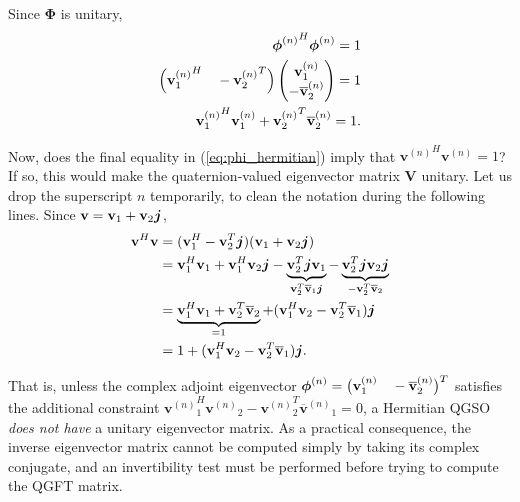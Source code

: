 Since $\mathbf{\Phi}$ is unitary,
\begin{equation}
\label{eq:phi_hermitian}
\begin{aligned}
{\mathbf{\boldsymbol{\phi}}^{(n)}}^H \mathbf{\boldsymbol{\phi}}^{(n)} = 1 \\
\Big({\mathbf{v}^{(n)}_1}^H \quad - {\mathbf{v}^{(n)}_2}^T \Big)
\begin{pmatrix}
\mathbf{v}^{(n)}_1 \\ 
- \overline{\mathbf{v}}^{(n)}_2
\end{pmatrix} = 1 \\
{\mathbf{v}^{(n)}_1}^H \mathbf{v}^{(n)}_1 + {\mathbf{v}^{(n)}_2}^T \overline{\mathbf{v}}^{(n)}_2 = 1.
\end{aligned}
\end{equation}

Now, does the final equality in (\ref{eq:phi_hermitian}) imply that ${\mathbf{v}^{(n)}}^H \mathbf{v}^{(n)} = 1$? If so, this would make the quaternion-valued eigenvector matrix $\mathbf{V}$ unitary. Let us drop the superscript $n$ temporarily, to clean the notation during the following lines. Since $\mathbf{v} = \mathbf{v}_1 + \mathbf{v}_2 \boldsymbol{j}$,
\begin{equation}
\begin{aligned}
\mathbf{v}^H \mathbf{v} &= (\mathbf{v}^H_1 - \mathbf{v}^T_2 \boldsymbol{j}) (\mathbf{v}_1 + \mathbf{v}_2 \boldsymbol{j}) \\
&= \mathbf{v}^H_1 \mathbf{v}_1 + \mathbf{v}^H_1 \mathbf{v}_2 \boldsymbol{j}
- \underbrace{\mathbf{v}^T_2 \boldsymbol{j} \mathbf{v}_1}_{\mathbf{v}^T_2 \overline{\mathbf{v}}_1 \boldsymbol{j}} - \underbrace{\mathbf{v}_2^T \boldsymbol{j} \mathbf{v}_2 \boldsymbol{j}}_{- \mathbf{v}_2^T \overline{\mathbf{v}}_2} \\
&= \underbrace{\mathbf{v}_1^H \mathbf{v}_1 + \mathbf{v}_2^T \overline{\mathbf{v}}_2}_{= 1} +
(\mathbf{v}^H_1 \mathbf{v}_2 - \mathbf{v}_2^T \overline{\mathbf{v}}_1) \boldsymbol{j} \\
&= 1 + (\mathbf{v}^H_1 \mathbf{v}_2 - \mathbf{v}_2^T \overline{\mathbf{v}}_1) \boldsymbol{j}.
\end{aligned}
\end{equation}

That is, unless the complex adjoint eigenvector $\mathbf{\boldsymbol{\phi}}^{(n)} = \big( \mathbf{v}^{(n)}_1 \quad - \overline{\mathbf{v}}^{(n)}_2 \big)^T$ satisfies the additional constraint ${\mathbf{v}^{(n)}}^H_1 {\mathbf{v}^{(n)}}_2 - {\mathbf{v}^{(n)}}_2^T {\overline{\mathbf{v}}^{(n)}}_1 = 0$, a Hermitian QGSO \textit{does not have} a unitary eigenvector matrix. As a practical consequence, the inverse eigenvector matrix cannot be computed simply by taking its complex conjugate, and an invertibility test must be performed before trying to compute the QGFT matrix.

